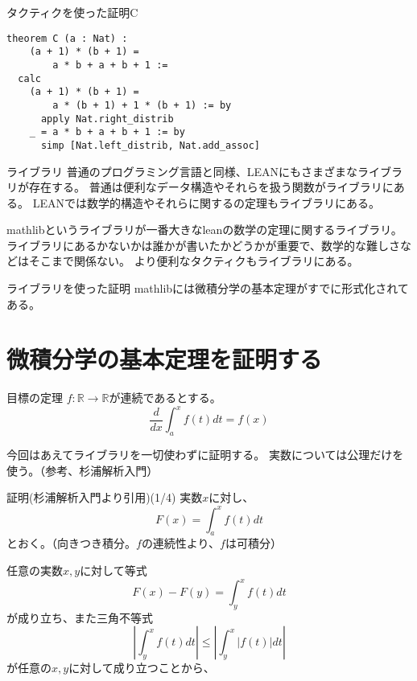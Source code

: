 \documentclass[unicode,12pt]{beamer}%
\begin{document}
\begin{frame}[fragile]{タクティクを使った証明C}
  \begin{tcolorbox}[title=Assist.lean]
  \setlength{\baselineskip}{12pt}
  \begin{Verbatim}[commandchars=\\\{\}, baselinestretch=1.5]
theorem C (a : Nat) :
    (a + 1) * (b + 1) =
        a * b + a + b + 1 :=
  calc
    (a + 1) * (b + 1) =
        a * (b + 1) + 1 * (b + 1) := by
      apply Nat.right_distrib
    _ = a * b + a + b + 1 := by
      simp [Nat.left_distrib, Nat.add_assoc]
  \end{Verbatim}
  \end{tcolorbox}  
\end{frame}

\begin{frame}{ライブラリ}
  普通のプログラミング言語と同様、LEANにもさまざまなライブラリが存在する。
  普通は便利なデータ構造やそれらを扱う関数がライブラリにある。
  LEANでは数学的構造やそれらに関するの定理もライブラリにある。

  mathlibというライブラリが一番大きなleanの数学の定理に関するライブラリ。
  ライブラリにあるかないかは誰かが書いたかどうかが重要で、数学的な難しさなどはそこまで関係ない。
  より便利なタクティクもライブラリにある。
\end{frame}

\begin{frame}{ライブラリを使った証明}
  mathlibには微積分学の基本定理がすでに形式化されてある。
\end{frame}

\section{微積分学の基本定理を証明する}

\begin{frame}{目標の定理}
  $f:\mathbb{R}\to\mathbb{R}$が連続であるとする。
  $$
    \frac{d}{dx}\int^x_af(t)dt=f(x)
  $$

  今回はあえてライブラリを一切使わずに証明する。
  実数については公理だけを使う。（参考、杉浦解析入門）
\end{frame}

\begin{frame}{証明(杉浦解析入門より引用)(1/4)}
  実数$x$に対し、
  $$
    F(x)=\int^x_af(t)dt
  $$
  とおく。（向きつき積分。$f$の連続性より、$f$は可積分）

  任意の実数$x, y$に対して等式
  $$
    F(x)-F(y)=\int^x_yf(t)dt
  $$
  が成り立ち、また三角不等式
  $$
    \left\lvert\int^x_yf(t)dt\right\rvert\leq\left\lvert\int^x_y\lvert f(t)\rvert dt\right\rvert
  $$
  が任意の$x, y$に対して成り立つことから、
\end{frame}
\end{document}
